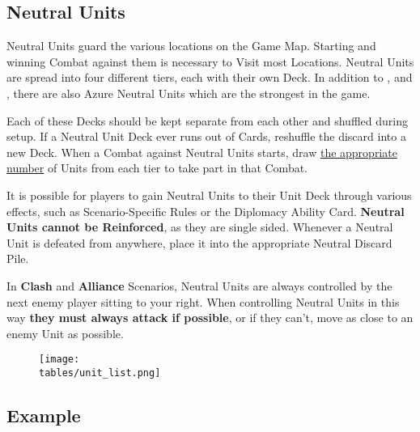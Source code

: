 \begin{multicols}{2}
\subsection*{Neutral Units}
Neutral Units guard the various locations on the Game Map.
Starting and winning Combat against them is necessary to Visit most Locations.
Neutral Units are spread into four different tiers, each with their own Deck.
In addition to ,  and , there are also Azure  Neutral Units which are the strongest in the game.\par
Each of these Decks should be kept separate from each other and shuffled during setup.
If a Neutral Unit Deck ever runs out of Cards, reshuffle the discard into a new Deck.
When a Combat against Neutral Units starts, draw \hyperlink{Difficulty}{the appropriate number} of Units from each tier to take part in that Combat.\par
It is possible for players to gain Neutral Units to their Unit Deck through various effects, such as Scenario-Specific Rules or the Diplomacy Ability Card.
\textbf{Neutral Units cannot be Reinforced}, as they are single sided.
Whenever a Neutral Unit is defeated from anywhere, place it into the appropriate Neutral Discard Pile.\par
In \textbf{Clash} and \textbf{Alliance} Scenarios, Neutral Units are always controlled by the next enemy player sitting to your right.
When controlling Neutral Units in this way \textbf{they must always attack if possible}, or if they can't, move as close to an enemy Unit as possible.\par

\end{multicols}

\begin{figure*}[!hb]
  \centering
  \texttt{[image: \\tables/unit\_list.png]}
\end{figure*}

\clearpage

\subsection*{Example}

